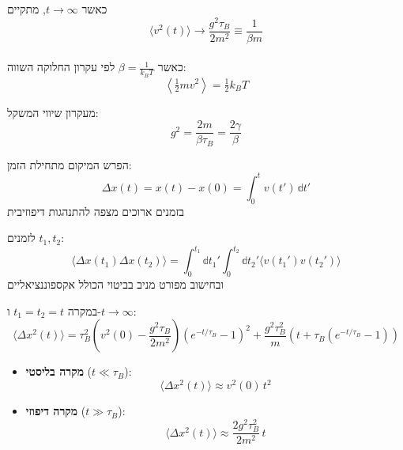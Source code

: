 \documentclass{tstextbook}
\begin{document}
\begin{proposition}
כאשר \(t \to \infty\), מתקיים\\
$$\langle v^{2}(t) \rangle \to \frac{g^{2}\tau_{B}}{2m^{2}} \equiv \frac{1}{\beta m}$$\\

כאשר \(\beta = \tfrac{1}{k_{B}T}\) לפי עקרון החלוקה השווה:\\
$$\left\langle \tfrac{1}{2} m v^{2} \right\rangle = \tfrac{1}{2} k_{B}T$$

\end{proposition}
\begin{proposition}
מעקרון שיווי המשקל:\\
$$g^{2} = \frac{2m}{\beta \tau_{B}} = \frac{2\gamma}{\beta}$$

\end{proposition}
\begin{definition}
הפרש המיקום מתחילת הזמן:\\
$$\Delta x(t) = x(t) - x(0) = \int_{0}^{t} v(t') \,\mathbb{d}t'$$
בזמנים ארוכים מצפה להתנהגות דיפוזיבית

\end{definition}
\begin{proposition}
לזמנים \(t_{1}, t_{2}\):\\
$$\langle \Delta x(t_{1}) \Delta x(t_{2}) \rangle = \int_{0}^{t_{1}} \mathbb{d}t_{1}' \int_{0}^{t_{2}} \mathbb{d}t_{2}' \langle v(t_{1}') v(t_{2}') \rangle$$
ובחישוב מפורט מניב בביטוי הכולל אקספוננציאליים

\end{proposition}
\begin{proposition}
במקרה \(t_{1}=t_{2}=t\) ו-\(t \to \infty\):\\
$$\langle \Delta x^{2}(t) \rangle = \tau_{B}^{2}\left( v^{2}(0) - \frac{g^{2}\tau_{B}}{2m^{2}} \right)\left(e^{-t/\tau_{B}} - 1\right)^{2} + \frac{g^{2}\tau_{B}^{2}}{m}\left(t + \tau_{B}(e^{-t/\tau_{B}} - 1)\right)$$

\end{proposition}
\begin{proposition}
  \begin{itemize}
    \item \textbf{מקרה בליסטי} (\(t \ll \tau_{B}\)):\\
$$\langle \Delta x^{2}(t) \rangle \approx v^{2}(0)\,t^{2}$$
    \item \textbf{מקרה דיפוזי} (\(t \gg \tau_{B}\)):\\
$$\langle \Delta x^{2}(t) \rangle \approx \frac{2g^{2}\tau_{B}^{2}}{2m^{2}}\,t$$
  \end{itemize}
\end{proposition}
\end{document}
